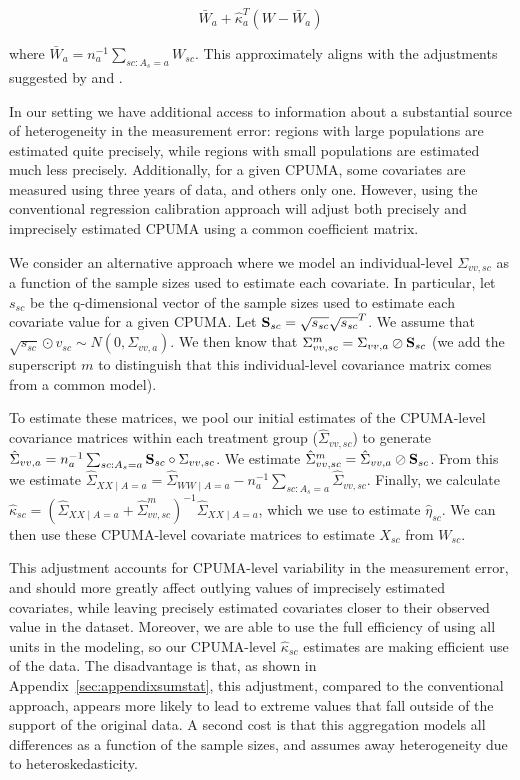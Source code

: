 \begin{equation}
\bar{W}_a + \hat{\kappa}_a^T(W - \bar{W}_a)
\end{equation}

where $\bar{W}_a = n_a^{-1}\sum_{sc: A_s = a} W_{sc}$. This approximately aligns with the adjustments suggested by \cite{carroll2006measurement} and \cite{gleser1992importance}. 

In our setting we have additional access to information about a substantial source of heterogeneity in the measurement error: regions with large populations are estimated quite precisely, while regions with small populations are estimated much less precisely. Additionally, for a given CPUMA, some covariates are measured using three years of data, and others only one. However, using the conventional regression calibration approach will adjust both precisely and imprecisely estimated CPUMA using a common coefficient matrix. 

We consider an alternative approach where we model an individual-level $\Sigma_{vv, sc}$ as a function of the sample sizes used to estimate each covariate. In particular, let $s_{sc}$ be the q-dimensional vector of the sample sizes used to estimate each covariate value for a given CPUMA. Let $\mathbf{S}_{sc} = \sqrt{s_{sc}}\sqrt{s_{sc}}^T$. We assume that $\sqrt{s_{sc}} \odot v_{sc} \sim N(0, \Sigma_{vv, a})$. We then know that $\Sigma_{vv, sc}^m = \Sigma_{vv, a} \oslash \mathbf{S}_{sc}$ (we add the superscript $m$ to distinguish that this individual-level covariance matrix comes from a common model).

To estimate these matrices, we pool our initial estimates of the CPUMA-level covariance matrices within each treatment group ($\hat{\Sigma}_{vv, sc}$) to generate $\hat{\Sigma}_{vv, a} = n_a^{-1}\sum_{sc: A_s = a} \mathbf{S}_{sc} \circ \Sigma_{vv, sc}$. We estimate $\hat{\Sigma}_{vv, sc}^m = \hat{\Sigma}_{vv, a} \oslash \mathbf{S}_{sc}$. From this we estimate $\hat{\Sigma}_{XX \mid A = a} = \hat{\Sigma}_{WW \mid A = a} - n_a^{-1}\sum_{sc: A_s = a}\hat{\Sigma}_{vv, sc}$. Finally, we calculate $\hat{\kappa}_{sc} = (\hat{\Sigma}_{XX \mid A = a} + \hat{\Sigma}_{vv, sc}^m)^{-1}\hat{\Sigma}_{XX \mid A = a}$, which we use to estimate $\hat{\eta}_{sc}$. We can then use these CPUMA-level covariate matrices to estimate $X_{sc}$ from $W_{sc}$.

This adjustment accounts for CPUMA-level variability in the measurement error, and should more greatly affect outlying values of imprecisely estimated covariates, while leaving precisely estimated covariates closer to their observed value in the dataset. Moreover, we are able to use the full efficiency of using all units in the modeling, so our CPUMA-level $\hat{\kappa}_{sc}$ estimates are making efficient use of the data. The disadvantage is that, as shown in Appendix~\ref{sec:appendixsumstat}, this adjustment, compared to the conventional approach, appears more likely to lead to extreme values that fall outside of the support of the original data. A second cost is that this aggregation models all differences as a function of the sample sizes, and assumes away heterogeneity due to heteroskedasticity. 
